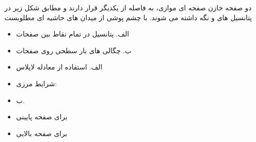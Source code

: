 
\begin{ELexample}{}

دو صفحه خازن صفحه ای موازی، به فاصله  از یکدیگر قرار دارند و مطابق شکل زیر در پتانسیل های  و  نگه داشته می شوند. با چشم پوشی از میدان های حاشیه ای مطلوبست

\begin{itemize}
\tightlist
\item
  الف. پتانسیل در تمام نقاط بین صفحات
\item
  ب. چگالی های بار سطحی روی صفحات
\end{itemize}


\begin{ELsolution}

\begin{itemize}
\tightlist
\item
  الف. استفاده از معادله لاپلاس
\end{itemize}


\begin{itemize}
\tightlist
\item
  شرایط مرزی:
\end{itemize}


\begin{itemize}
\tightlist
\item
  ب.
\end{itemize}


\begin{itemize}
\tightlist
\item
  برای صفحه پایینی
\end{itemize}


\begin{itemize}
\tightlist
\item
  برای صفحه بالایی
\end{itemize}


\end{ELsolution}

\end{ELexample}

